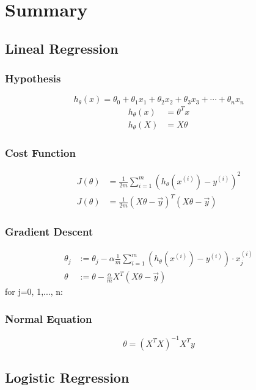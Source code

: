 \chapter{Summary}
\section{Lineal Regression}
\subsection{Hypothesis}
\begin{equation}
h_\theta (x) = \theta_0 + \theta_1 x_1 + \theta_2 x_2 + \theta_3 x_3 + \cdots + \theta_n x_n 
\end{equation}
\begin{align}
h_\theta(x) &= \theta^T x \\
h_\theta(X) &= X\theta 
\end{align}
\subsection{Cost Function}
\begin{align}
J(\theta) &= \frac{1}{2m} \sum_{i=1}^m \left(h_\theta (x^{(i)}) - y^{(i)} \right)^2 \\
J(\theta) &= \frac{1}{2m} (X\theta - \vec{y})^T (X\theta - \vec{y})
\end{align}
\subsection{Gradient Descent}
\begin{align}
\theta_j &:= \theta_j - \alpha \frac{1}{m} \sum\limits_{i=1}^{m} (h_\theta(x^{(i)}) - y^{(i)}) \cdot x_j^{(i)} \\
\theta &:= \theta - \frac{\alpha}{m}X^T (X\theta - \vec{y})
\end{align}
for j=0, 1,..., n:
\subsection{Normal Equation}
\begin{equation}
\theta=(X^TX)^{-1}X^Ty
\end{equation}
\section{Logistic Regression}
